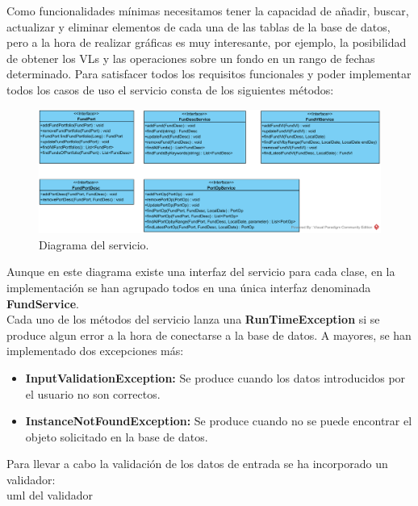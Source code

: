 \documentclass[12pt, a4paper]{book}
\begin{document}
Como funcionalidades mínimas necesitamos tener la capacidad de añadir, buscar, actualizar y eliminar elementos de cada una de las tablas de la base de datos, pero a la hora de realizar gráficas es muy interesante, por ejemplo, la posibilidad de obtener los \gls{VL}s y las operaciones sobre un fondo en un rango de fechas determinado. Para satisfacer todos los requisitos funcionales y poder implementar todos los casos de uso el servicio consta de los siguientes métodos:\\

\begin{figure}[htbp]
	\centering
	\includegraphics[width=\textwidth]{figuras/Diagrama_Modelo.png}
	\caption{Diagrama del servicio.}
	\label{fig:servicio}
	\end {figure}

Aunque en este diagrama existe una interfaz del servicio para cada clase, en la implementación se han agrupado todos en una única interfaz denominada \textbf{FundService}.\\

Cada uno de los métodos del servicio lanza una \textbf{RunTimeException} si se produce algun error a la hora de conectarse a la base de datos. A mayores, se han implementado dos excepciones más:

\begin{itemize}
	\item \textbf{InputValidationException:} Se produce cuando los datos introducidos por el usuario no son correctos.
	\item \textbf{InstanceNotFoundException:} Se produce cuando no se puede encontrar el objeto solicitado en la base de datos.
\end{itemize}


Para llevar a cabo la validación de los datos de entrada se ha incorporado un validador: \\

uml del validador\\

\newpage
\end{document}

